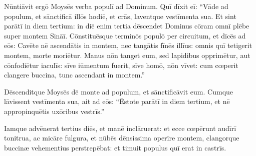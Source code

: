 Nūntiāvit ergō Moysēs verba populī ad Dominum.  Quī dīxit eī: ``Vāde ad populum, et sānctificā illōs hodiē, et crās, laventque vestīmenta sua. 
Et sint parātī in diem tertium: in diē enim tertia dēscendet Dominus cōram
omnī plēbe super montem Sināī. 
Cōnstituēs\-que terminōs populō per circuitum, et dīcēs ad eōs: Cavēte nē
ascendātis in montem, nec tangātis fīnēs illīus: omnis quī tetigerit
montem, morte moriētur.
Manus nōn tanget eum, sed
lapidibus opprimētur, aut cōnfodiētur iaculīs:
sīve iūmentum fuerit, sīve homō, nōn vīvet: cum cœperit
clangere buccina, tunc ascendant in montem.''

Dēscenditque Moysēs dē monte ad populum, et sānctificāvit eum. Cumque
lāvissent vestīmenta sua, 
ait ad eōs: ``Ēstote parātī in diem tertium, et
nē appropinquētis uxōribus vestrīs.''

Iamque advēnerat tertius diēs, et
manē inclāruerat: et ecce cœpērunt audīrī tonitrua, ac
micāre fulgura, et nūbēs dēnsissima operīre montem, clangorque
buccinæ vehementius
perstrepēbat: et timuit populus quī erat in castrīs. 

